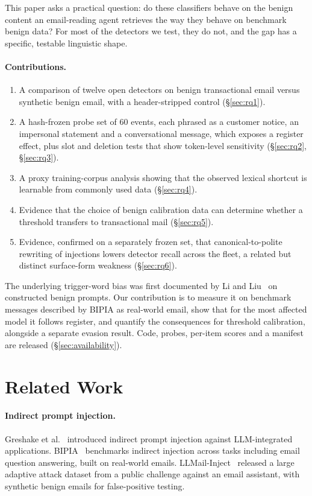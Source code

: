 \documentclass[11pt]{article}
\begin{document}
This paper asks a practical question: do these classifiers behave on the benign content an email-reading agent retrieves the way they behave on benchmark benign data? For most of the detectors we test, they do not, and the gap has a specific, testable linguistic shape.

\paragraph{Contributions.}
\begin{enumerate}
  \item A comparison of twelve open detectors on benign transactional email versus synthetic benign email, with a header-stripped control (\S\ref{sec:rq1}).
  \item A hash-frozen probe set of 60 events, each phrased as a customer notice, an impersonal statement and a conversational message, which exposes a register effect, plus slot and deletion tests that show token-level sensitivity (\S\ref{sec:rq2}, \S\ref{sec:rq3}).
  \item A proxy training-corpus analysis showing that the observed lexical shortcut is learnable from commonly used data (\S\ref{sec:rq4}).
  \item Evidence that the choice of benign calibration data can determine whether a threshold transfers to transactional mail (\S\ref{sec:rq5}).
  \item Evidence, confirmed on a separately frozen set, that canonical-to-polite rewriting of injections lowers detector recall across the fleet, a related but distinct surface-form weakness (\S\ref{sec:rq6}).
\end{enumerate}

The underlying trigger-word bias was first documented by Li and Liu~\cite{li2024injecguard} on constructed benign prompts. Our contribution is to measure it on benchmark messages described by BIPIA as real-world email, show that for the most affected model it follows register, and quantify the consequences for threshold calibration, alongside a separate evasion result. Code, probes, per-item scores and a manifest are released (\S\ref{sec:availability}).

\section{Related Work}

\paragraph{Indirect prompt injection.}
Greshake et al.~\cite{greshake2023} introduced indirect prompt injection against LLM-integrated applications. BIPIA~\cite{yi2023bipia} benchmarks indirect injection across tasks including email question answering, built on real-world emails. LLMail-Inject~\cite{abdelnabi2025llmail} released a large adaptive attack dataset from a public challenge against an email assistant, with synthetic benign emails for false-positive testing.
\end{document}
